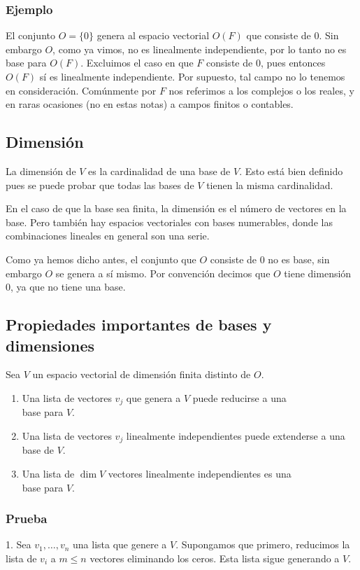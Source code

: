 \documentclass{article}
\begin{document}
\subsubsection*{Ejemplo}
El conjunto $O=\{0\}$ genera al espacio vectorial $O(F)$
que consiste de $0$. Sin embargo $O$, como ya vimos, no es linealmente independiente,
por lo tanto no es base para $O(F)$.
Excluimos el caso en que $F$ consiste de $0$, pues entonces $O(F)$ sí es linealmente independiente.
Por supuesto, tal campo no lo tenemos en consideración. Comúnmente por $F$ nos referimos
a los complejos o los reales, y en raras ocasiones (no en estas notas)
a campos finitos o contables.

\subsection{Dimensión}
La dimensión de $V$ es la cardinalidad de una base de $V$.
Esto está bien definido pues se puede probar que todas las bases de
$V$ tienen la misma cardinalidad. 

En el caso de que la base sea
finita, la dimensión es el número de vectores en la base. Pero
también hay espacios vectoriales con bases numerables, 
donde las combinaciones lineales en general son una serie.

Como ya hemos dicho antes, el conjunto que $O$ consiste de $0$ no es base, sin embargo $O$ se genera a sí mismo. Por convención decimos que $O$ tiene dimensión $0$, ya que no tiene una base.
\newpage

\subsection{Propiedades importantes de bases y dimensiones}
\label{bases}
Sea $V$ un espacio vectorial de dimensión finita distinto de $O$.
\begin{enumerate}
    \item Una lista de vectores $v_j$ que genera a $V$ puede
    reducirse a una\\
    base para $V$.
    \item Una lista de vectores $v_j$ linealmente independientes 
    puede extenderse a una base de $V$.
    \item Una lista de $\dim V$ vectores linealmente independientes es una\\
    base para $V$.
\end{enumerate}
\subsubsection*{Prueba}
1. Sea $v_1,\ldots,v_n$ una lista que genere a $V$.
Supongamos que primero, reducimos la lista de $v_i$ a $m\leq n$ 
vectores eliminando los ceros. Esta lista sigue generando a $V$.
\end{document}
